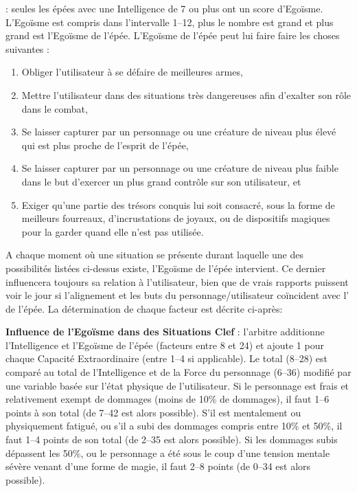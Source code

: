 {\bigskip

 : seules les épées avec une Intelligence de 7 ou plus ont un score d'Egoïsme. L'Egoïsme est compris dans l'intervalle 1--12, plus le nombre est grand et plus grand est l'Egoïsme de l'épée. L'Egoïsme de l'épée peut lui faire faire les choses suivantes :

\begin{enumerate}
\item Obliger l'utilisateur à se défaire de meilleures armes,
\item Mettre l'utilisateur dans des situations très dangereuses afin d'exalter son rôle dans le combat,
\item Se laisser capturer par un personnage ou une créature de niveau plus élevé qui est plus proche de l'esprit de l'épée,
\item Se laisser capturer par un personnage ou une créature de niveau plus faible dans le but d'exercer un plus grand contrôle sur son utilisateur, et
\item Exiger qu'une partie des trésors conquis lui soit consacré, sous la forme de meilleurs fourreaux, d'incrustations de joyaux, ou de dispositifs magiques pour la garder quand elle n'est pas utilisée.
\end{enumerate}

A chaque moment où une situation se présente durant laquelle une des possibilités listées ci-dessus existe, l'Egoïsme de l'épée intervient. Ce dernier influencera toujours sa relation à l'utilisateur, bien que de vrais rapports puissent voir le jour si l'alignement et les buts du personnage/utilisateur coïncident avec l' de l'épée. La détermination de chaque facteur est décrite ci-après:

\begin{center}
\begin{minipage}{0.8\linewidth}
\textbf{Influence de l'Egoïsme dans des Situations Clef} : l'arbitre additionne l'Intelligence et l'Egoïsme de l'épée (facteurs entre 8 et 24) et ajoute 1 pour chaque Capacité Extraordinaire (entre 1--4 si applicable). Le total (8--28) est comparé au total de l'Intelligence et de la Force du personnage (6--36) modifié par une variable basée sur l'état physique de l'utilisateur. Si le personnage est frais et relativement exempt de dommages (moins de 10\% de dommages), il faut  1--6 points à son total (de 7--42 est alors possible). S'il est mentalement ou physiquement fatigué, ou s'il a subi des dommages compris entre 10\% et 50\%, il faut  1--4 points de son total (de 2--35 est alors possible). Si les dommages subis dépassent les 50\%, ou le personnage a été sous le coup d'une tension mentale sévère venant d'une forme de magie, il faut  2--8 points (de 0--34 est alors possible).


\end{minipage}
\end{center}}
